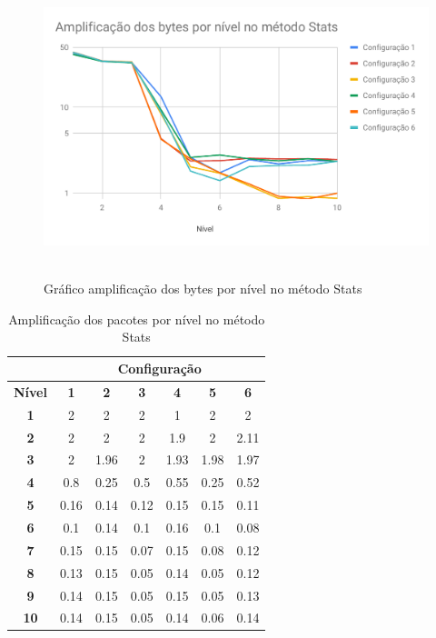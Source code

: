\begin{figure}[H]
     \centering
     \includegraphics[scale=0.7]{img/AmpStats.pdf}\
     \caption{Gráfico amplificação dos bytes por nível no método Stats}
\end{figure}

\begin{table}[H]
\centering
\caption{Amplificação dos pacotes por nível no método Stats}
\label{tab:AmpPacStats}
\begin{tabular}{|c|c|c|c|c|c|c|}
\hline
               & \multicolumn{6}{c|}{\textbf{Configuração}}                                  \\ \hline
\textbf{Nível} & \textbf{1} & \textbf{2} & \textbf{3} & \textbf{4} & \textbf{5} & \textbf{6} \\ \hline
\textbf{1}     & 2          & 2          & 2          & 1          & 2          & 2          \\ \hline
\textbf{2}     & 2          & 2          & 2          & 1.9        & 2          & 2.11       \\ \hline
\textbf{3}     & 2          & 1.96       & 2          & 1.93       & 1.98       & 1.97       \\ \hline
\textbf{4}     & 0.8        & 0.25       & 0.5        & 0.55       & 0.25       & 0.52       \\ \hline
\textbf{5}     & 0.16       & 0.14       & 0.12       & 0.15       & 0.15       & 0.11       \\ \hline
\textbf{6}     & 0.1        & 0.14       & 0.1        & 0.16       & 0.1        & 0.08       \\ \hline
\textbf{7}     & 0.15       & 0.15       & 0.07       & 0.15       & 0.08       & 0.12       \\ \hline
\textbf{8}     & 0.13       & 0.15       & 0.05       & 0.14       & 0.05       & 0.12       \\ \hline
\textbf{9}     & 0.14       & 0.15       & 0.05       & 0.15       & 0.05       & 0.13       \\ \hline
\textbf{10}    & 0.14       & 0.15       & 0.05       & 0.14       & 0.06       & 0.14       \\ \hline
\end{tabular}
\end{table}

